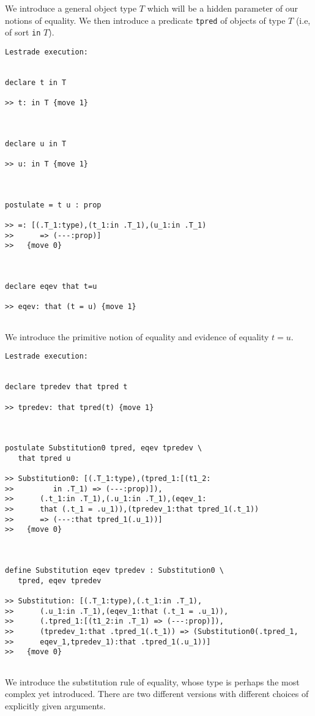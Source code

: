 \documentclass[12pt]{article}
\begin{document}
We introduce a general object type $T$ which will be a hidden parameter of our notions of equality.  We then introduce  a predicate {\tt tpred} of objects of type $T$ (i.e, of sort {\tt in} $T$).

\begin{verbatim}Lestrade execution:


declare t in T

>> t: in T {move 1}



declare u in T

>> u: in T {move 1}



postulate = t u : prop

>> =: [(.T_1:type),(t_1:in .T_1),(u_1:in .T_1)
>>      => (---:prop)]
>>   {move 0}



declare eqev that t=u

>> eqev: that (t = u) {move 1}


\end{verbatim}

We introduce the primitive notion of equality and evidence of equality $t=u$.

\begin{verbatim}Lestrade execution:


declare tpredev that tpred t

>> tpredev: that tpred(t) {move 1}



postulate Substitution0 tpred, eqev tpredev \
   that tpred u

>> Substitution0: [(.T_1:type),(tpred_1:[(t1_2:
>>         in .T_1) => (---:prop)]),
>>      (.t_1:in .T_1),(.u_1:in .T_1),(eqev_1:
>>      that (.t_1 = .u_1)),(tpredev_1:that tpred_1(.t_1))
>>      => (---:that tpred_1(.u_1))]
>>   {move 0}



define Substitution eqev tpredev : Substitution0 \
   tpred, eqev tpredev

>> Substitution: [(.T_1:type),(.t_1:in .T_1),
>>      (.u_1:in .T_1),(eqev_1:that (.t_1 = .u_1)),
>>      (.tpred_1:[(t1_2:in .T_1) => (---:prop)]),
>>      (tpredev_1:that .tpred_1(.t_1)) => (Substitution0(.tpred_1,
>>      eqev_1,tpredev_1):that .tpred_1(.u_1))]
>>   {move 0}


\end{verbatim}

We introduce the substitution rule of equality, whose type is perhaps the most complex yet introduced.   There are two different versions with different choices of explicitly given arguments.
\end{document}
